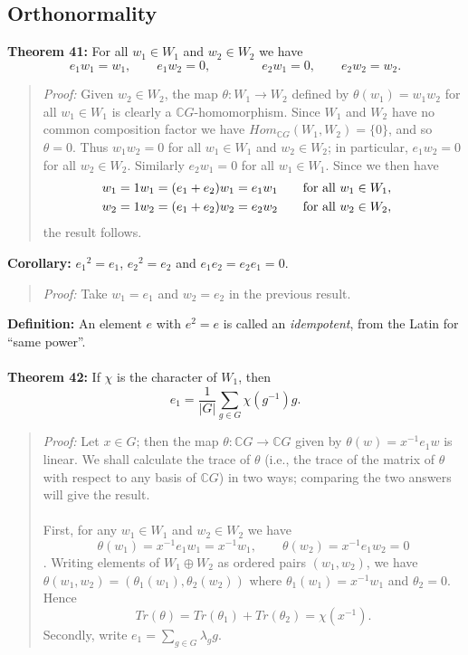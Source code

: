 {\subsection{Orthonormality}
{\bf Theorem 41:} For all $w_1\in W_1$ and
$w_2\in W_2$ we have
$$e_1w_1=w_1,\qquad e_1w_2=0,\qquad\qquad e_2w_1=0,\qquad
e_2w_2=w_2.$$
\begin{quote}
\emph{Proof:}
Given $w_2\in W_2$, the map $\theta:W_1\rightarrow W_2$ defined by
$\theta(w_1)=w_1w_2$ for all $w_1\in W_1$ is clearly a ${\mathbb C}G$-homomorphism. 
Since $W_1$ and $W_2$ have no common composition factor we
have $ Hom_{{\mathbb C}G}(W_1,W_2)=\{0\}$, and so $\theta=0$. Thus $w_1w_2=0$ for all
$w_1\in W_1$ and $w_2\in W_2$; in particular, $e_1w_2=0$ for all $w_2\in W_2$.
Similarly $e_2w_1=0$ for all $w_1\in W_1$. Since we then have
\begin{eqnarray*}
&w_1=1w_1=(e_1+e_2)w_1=e_1w_1\qquad\hbox{for all }w_1\in W_1,&\\
&w_2=1w_2=(e_1+e_2)w_2=e_2w_2\qquad\hbox{for all }w_2\in W_2,&
\end{eqnarray*}
the result follows.
\end{quote}
{\bf Corollary:} ${e_1}^2=e_1$, ${e_2}^2=e_2$ and
$e_1e_2=e_2e_1=0$.
\begin{quote}
\emph{Proof:}
Take $w_1=e_1$ and $w_2=e_2$ in the previous result.
\end{quote}
{\bf Definition:}
An element $e$ with $e^2=e$ is called an \emph{idempotent},
from the Latin for ``same power''.
\\
\\
{\bf Theorem 42:} If $\chi$ is the character of $W_1$, then
$$e_1=\frac{1}{|G|}\sum_{g\in G}\chi(g^{-1})g.$$
\begin{quote}
\emph{Proof:}
Let $x \in G$; then the map $\theta: {\mathbb C}G \rightarrow {\mathbb C}G$ given by
$\theta(w)=x^{-1}e_1w$ is linear. We shall calculate the trace of
$\theta$ (i.e., the trace of the matrix of $\theta$ with respect to
any basis of ${\mathbb C}G$) in two ways; comparing the two answers will give the
result.
\\
\\
First, for any $w_1\in W_1$ and $w_2\in W_2$ we have
$$\theta(w_1)=x^{-1}e_1w_1=x^{-1}w_1,\qquad\theta(w_2)=x^{-1}e_1w_2=0$$.
Writing elements of $W_1\oplus W_2$ as
ordered pairs $(w_1,w_2)$, we have
$\theta(w_1,w_2)=(\theta_1(w_1),\theta_2(w_2))$ where
$\theta_1(w_1)=x^{-1}w_1$ and $\theta_2=0$. Hence
$$Tr(\theta) =Tr(\theta_1) +Tr(\theta_2) =\chi(x^{-1}).$$
Secondly, write $e_1=\sum_{g\in G}\lambda_gg$. 

\end{quote}}
